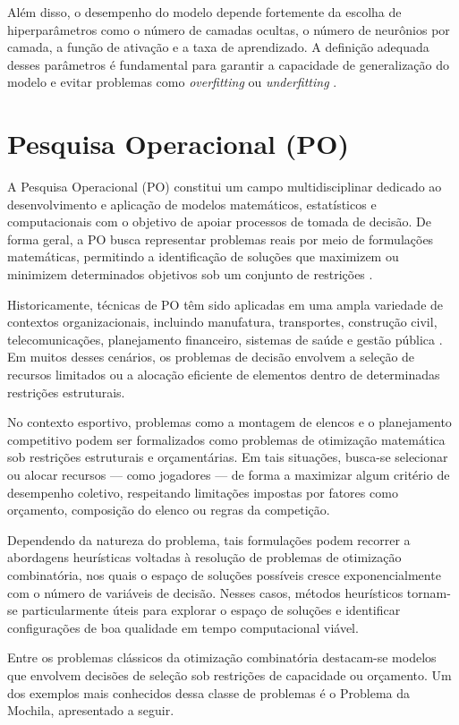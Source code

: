 Além disso, o desempenho do modelo depende fortemente da escolha de hiperparâmetros como o número de camadas ocultas, o número de neurônios por camada, a função de ativação 
e a taxa de aprendizado. A definição adequada desses parâmetros é fundamental para garantir a capacidade de generalização do modelo e evitar problemas como 
\textit{overfitting} ou \textit{underfitting} \cite{Geron2019}.

\section{Pesquisa Operacional (PO)}

A Pesquisa Operacional (PO) constitui um campo multidisciplinar dedicado ao desenvolvimento e aplicação de modelos matemáticos, estatísticos e computacionais com o 
objetivo de apoiar processos de tomada de decisão. De forma geral, a PO busca representar problemas reais por meio de formulações matemáticas, 
permitindo a identificação de soluções que maximizem ou minimizem determinados objetivos sob um conjunto de restrições \cite{Hillier2001}.

Historicamente, técnicas de PO têm sido aplicadas em uma ampla variedade de contextos organizacionais, incluindo manufatura, transportes, construção civil, 
telecomunicações, planejamento financeiro, sistemas de saúde e gestão pública \cite{Hillier2001}. Em muitos desses cenários, os problemas de decisão 
envolvem a seleção de recursos limitados ou a alocação eficiente de elementos dentro de determinadas restrições estruturais.

No contexto esportivo, problemas como a montagem de elencos e o planejamento competitivo podem ser formalizados como problemas de otimização matemática sob 
restrições estruturais e orçamentárias. Em tais situações, busca-se selecionar ou alocar recursos — como jogadores — de forma a maximizar algum critério de 
desempenho coletivo, respeitando limitações impostas por fatores como orçamento, composição do elenco ou regras da competição.

Dependendo da natureza do problema, tais formulações podem recorrer a abordagens heurísticas voltadas à resolução de problemas de otimização combinatória, 
nos quais o espaço de soluções possíveis cresce exponencialmente com o número de variáveis de decisão. Nesses casos, métodos heurísticos tornam-se particularmente 
úteis para explorar o espaço de soluções e identificar configurações de boa qualidade em tempo computacional viável.

Entre os problemas clássicos da otimização combinatória destacam-se modelos que envolvem decisões de seleção sob restrições de capacidade ou orçamento. 
Um dos exemplos mais conhecidos dessa classe de problemas é o Problema da Mochila, apresentado a seguir.

